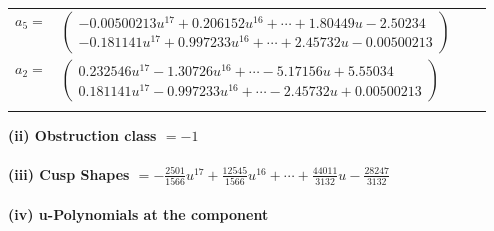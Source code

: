 \documentclass[1p]{elsarticle_modified}
\theoremstyle{definition}
\begin{document}
\begin{tabular}{m{7pt} m{180pt} m{7pt} m{180pt} }
\flushright $a_{5}=$&$\begin{pmatrix}-0.00500213 u^{17}+0.206152 u^{16}+\cdots+1.80449 u-2.50234\\-0.181141 u^{17}+0.997233 u^{16}+\cdots+2.45732 u-0.00500213\end{pmatrix}$ \\
\flushright $a_{2}=$&$\begin{pmatrix}0.232546 u^{17}-1.30726 u^{16}+\cdots-5.17156 u+5.55034\\0.181141 u^{17}-0.997233 u^{16}+\cdots-2.45732 u+0.00500213\end{pmatrix}$\\&\end{tabular}
\flushleft \textbf{(ii) Obstruction class $= -1$}\\~\\
\flushleft \textbf{(iii) Cusp Shapes $= -\frac{2501}{1566} u^{17}+\frac{12545}{1566} u^{16}+\cdots+\frac{44011}{3132} u-\frac{28247}{3132}$}\\~\\
\newpage\renewcommand{\arraystretch}{1}
\flushleft \textbf{(iv) u-Polynomials at the component}\newline \\
\end{document}
